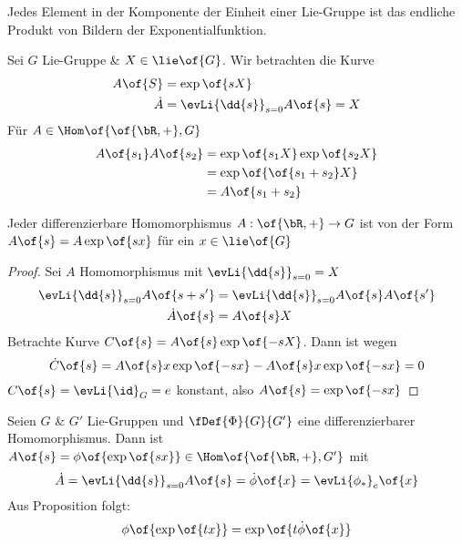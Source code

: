 \begin{satz}
	Jedes Element in der Komponente der Einheit einer Lie-Gruppe ist das endliche Produkt von Bildern der Exponentialfunktion.
\end{satz}
Sei $G$ Lie-Gruppe \& $X \in \lie\of{G}$. Wir betrachten die Kurve
\begin{equation}
	\begin{split}
		A\of{S} & = \exp\of{s X} \\
		\dot{A} & = \evLi{\dd{s}}_{s=0} A\of{s} = X
	\end{split}
\end{equation}
Für $A \in \Hom\of{\of{\bR,+},G}$
\begin{equation}
	\begin{split}
		A\of{s_1}A\of{s_2} & = \exp\of{s_1 X}\exp\of{s_2 X} \\
		& = \exp\of{\of{s_1+s_2}X} \\
		& = A\of{s_1+s_2}
	\end{split}
\end{equation}
\begin{proposition}
	Jeder differenzierbare Homomorphismus $A: \of{\bR,+}\to G$ ist von der Form $A\of{s} = A\exp\of{s x}$ für ein $x \in \lie\of{G}$
\end{proposition}
\begin{proof}
	Sei $A$ \difb Homomorphismus mit $\evLi{\dd{s}}_{s=0} = X$
	\begin{equation}
		\begin{split}
			\evLi{\dd{s}}_{s=0} A\of{s + s'} & = \evLi{\dd{s}}_{s=0}A\of{s}A\of{s'} \\
			\dot{A}\of{s} & = A\of{s}X
		\end{split}
	\end{equation}
	Betrachte Kurve $C\of{s} = A\of{s}\exp\of{-s X}$. Dann ist wegen
	\begin{equation}
		\dot{C}\of{s} = A\of{s} x \exp\of{-s x} - A\of{s} x \exp\of{-s x} = 0
	\end{equation}
	$C\of{s} = \evLi{\id}_G = e$ konstant, also $A\of{s} = \exp\of{-s x}$
\end{proof}
Seien $G$ \& $G'$ Lie-Gruppen und $\fDef{\Phi}{G}{G'}$ eine differenzierbarer Homomorphismus. Dann ist $A \of{s} = \phi\of{\exp\of{sx}} \in \Hom\of{\of{\bR,+},G'}$ mit 
\begin{equation}
	\dot{A} = \evLi{\dd{s}}_{s=0}A\of{s} = \dot{\phi}\of{x} = \evLi{\phi_{*}}_e \of{x}
\end{equation}
Aus Proposition folgt:
\begin{equation}
	\phi\of{\exp\of{t x}} = \exp\of{t \dot{\phi}\of{x}}
\end{equation}

